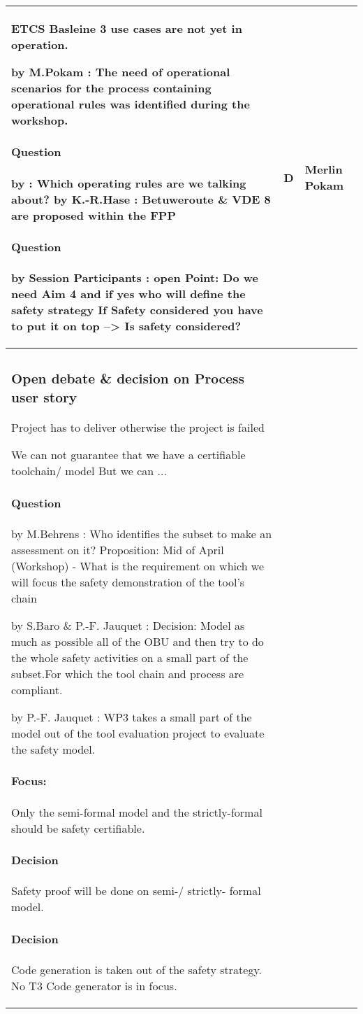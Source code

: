 \documentclass[a4paper]{article}
\newcommand{\Q}[2]{\paragraph{Question} 
	\ifthenelse{\isempty{#1}}%
    	{}%
    	{by #1}%
    : #2}
\newcommand{\A}[2]{\newline{\textbf{Answer}}
	\ifthenelse{\isempty{#1}}%
    	{}%
    	{by #1}%
    : #2}
\newcommand{\C}[2]{\newline{\textbf{Comment}}
	\ifthenelse{\isempty{#1}}%
    	{}%
    	{by #1}%
    : #2}
\begin{document}
\begin{longtable}{|p{}|p{}|p{}|}
ETCS Basleine 3 use cases are not yet in operation.

\C{M.Pokam}{The need of operational scenarios for the process containing operational rules was identified during the workshop.}
\Q{}{Which operating rules are we talking about?}
\A{K.-R.Hase}{Betuweroute \& VDE 8 are proposed within the FPP}

\Q{Session Participants}{open Point: Do we need Aim 4 and if yes who will define the safety strategy 
If Safety considered you have to put it on top  --> Is safety considered?}

& D
& Merlin Pokam
\\\hline
\subsubsection{Open debate \& decision on Process user story} %

Project has to deliver otherwise the project is failed

We can not guarantee that we have a certifiable toolchain/ model
But we can ...

\Q{M.Behrens}{Who identifies the subset to make an assessment on it?}
Proposition: Mid of April (Workshop) - What is the requirement on which we will focus the safety demonstration of the tool's chain

\C{S.Baro \& P.-F. Jauquet}{Decision: Model as much as possible all of the OBU and then try to do the whole safety activities on a small part of the subset.For which the tool chain and process are compliant.}

\C{P.-F. Jauquet}{WP3 takes a small part of the model out of the tool evaluation project to evaluate the safety model.}

\paragraph{Focus:} Only the semi-formal model and the strictly-formal should be safety certifiable.


\paragraph{Decision} Safety proof will be done on semi-/ strictly- formal model.
\paragraph{Decision} Code generation is taken out of the safety strategy. No T3 Code generator is in focus.


\end{longtable}
\end{document}
